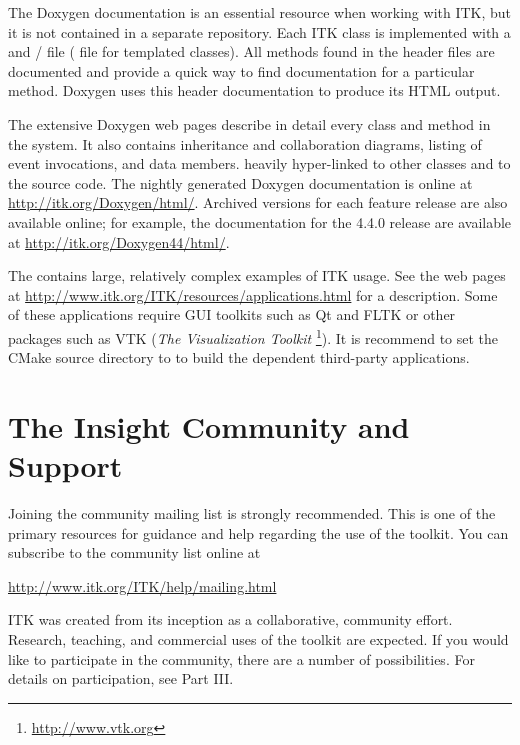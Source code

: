 The Doxygen documentation is an essential resource when working with ITK, but
it is not contained in a separate repository. Each ITK class is implemented
with a  and / file ( file for
templated classes). All methods found in the  header files are
documented and provide a quick way to find documentation for a particular
method.  Doxygen uses this header documentation to produce its HTML output.

The extensive Doxygen web pages describe in detail every class and method in
the system. It also contains inheritance and collaboration diagrams, listing
of event invocations, and data members.  heavily hyper-linked to other classes
and to the source code. The nightly generated Doxygen documentation is online at
\url{http://itk.org/Doxygen/html/}. Archived versions for each feature release
are also available online; for example, the documentation for the 4.4.0
release are available at \url{http://itk.org/Doxygen44/html/}.

The  contains large, relatively complex
examples of ITK usage. See the web pages at
\url{http://www.itk.org/ITK/resources/applications.html} for a description. Some of
these applications require GUI toolkits such as Qt and FLTK or other packages
such as VTK (\emph{The Visualization Toolkit}
\footnote{\url{http://www.vtk.org}}). It is recommend to set the CMake source directory
to  to build the dependent third-party applications.


\section{The Insight Community and Support}
\label{sec:AdditionalResources}
\label{sec:JoinMailList}


Joining the community mailing list is strongly recommended. This is one of the
primary resources for guidance and help regarding the use of the toolkit. You
can subscribe to the community list online at

\begin{center}
\url{http://www.itk.org/ITK/help/mailing.html}
\end{center}

ITK was created from its inception as a collaborative, community
effort. Research, teaching, and commercial uses of the toolkit are
expected. If you would like to participate in the community, there are a
number of possibilities.  For details on participation, see Part III.

